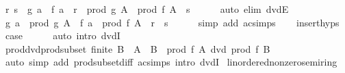 \begin{isabellebody}
\ r\ s\ \ {\isachardoublequoteopen}g\ a\ {\isacharequal}{\kern0pt}\ f\ a\ {\isacharasterisk}{\kern0pt}\ r{\isachardoublequoteclose}\ \ {\isachardoublequoteopen}prod\ g\ A\ {\isacharequal}{\kern0pt}\ prod\ f\ A\ {\isacharasterisk}{\kern0pt}\ s{\isachardoublequoteclose}\isanewline
\ \ \ \ \isamarkupfalse%
\ {\isacharparenleft}{\kern0pt}auto\ elim{\isacharbang}{\kern0pt}{\isacharcolon}{\kern0pt}\ dvdE{\isacharparenright}{\kern0pt}\isanewline
\ \ \isamarkupfalse%
\ \isamarkupfalse%
\ {\isachardoublequoteopen}g\ a\ {\isacharasterisk}{\kern0pt}\ prod\ g\ A\ {\isacharequal}{\kern0pt}\ f\ a\ {\isacharasterisk}{\kern0pt}\ prod\ f\ A\ {\isacharasterisk}{\kern0pt}\ {\isacharparenleft}{\kern0pt}r\ {\isacharasterisk}{\kern0pt}\ s{\isacharparenright}{\kern0pt}{\isachardoublequoteclose}\isanewline
\ \ \ \ \isamarkupfalse%
\ {\isacharparenleft}{\kern0pt}simp\ add{\isacharcolon}{\kern0pt}\ ac{\isacharunderscore}{\kern0pt}simps{\isacharparenright}{\kern0pt}\isanewline
\ \ \isamarkupfalse%
\ insert{\isachardot}{\kern0pt}hyps\ \isamarkupfalse%
\ {\isacharquery}{\kern0pt}case\isanewline
\ \ \ \ \isamarkupfalse%
\ {\isacharparenleft}{\kern0pt}auto\ intro{\isacharcolon}{\kern0pt}\ dvdI{\isacharparenright}{\kern0pt}\isanewline
{}\isamarkupfalse%
%
\endisatagproof
{\isafoldproof}%
%
\isadelimproof
\isanewline
%
\endisadelimproof
\isanewline
{}\isamarkupfalse%
\ prod{\isacharunderscore}{\kern0pt}dvd{\isacharunderscore}{\kern0pt}prod{\isacharunderscore}{\kern0pt}subset{\isacharcolon}{\kern0pt}\ {\isachardoublequoteopen}finite\ B\ {\isasymLongrightarrow}\ A\ {\isasymsubseteq}\ B\ {\isasymLongrightarrow}\ prod\ f\ A\ dvd\ prod\ f\ B{\isachardoublequoteclose}\isanewline
%
\isadelimproof
\ \ %
\endisadelimproof
%
\isatagproof
{}\isamarkupfalse%
\ {\isacharparenleft}{\kern0pt}auto\ simp\ add{\isacharcolon}{\kern0pt}\ prod{\isachardot}{\kern0pt}subset{\isacharunderscore}{\kern0pt}diff\ ac{\isacharunderscore}{\kern0pt}simps\ intro{\isacharcolon}{\kern0pt}\ dvdI{\isacharparenright}{\kern0pt}%
\endisatagproof
{\isafoldproof}%
%
\isadelimproof
\isanewline
%
\endisadelimproof
\isanewline
{}\isamarkupfalse%
%
\isadelimdocument
%
\endisadelimdocument
%
\isatagdocument
%
\isamarkuptrue%
%
\endisatagdocument
{\isafolddocument}%
%
\isadelimdocument
%
\endisadelimdocument
{}\isamarkupfalse%
\ linordered{\isacharunderscore}{\kern0pt}nonzero{\isacharunderscore}{\kern0pt}semiring\isanewline

\end{isabellebody}
